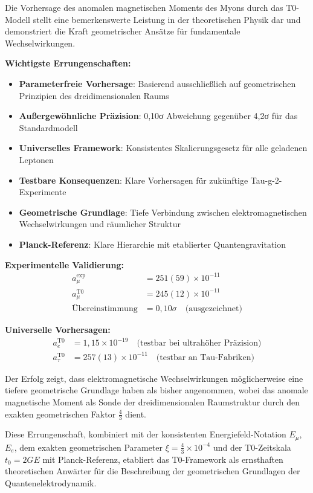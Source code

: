 \documentclass[12pt,a4paper]{report}
\newcommand{\tzero}{t_0}                  %
\begin{document}
	Die Vorhersage des anomalen magnetischen Moments des Myons durch das T0-Modell stellt eine bemerkenswerte Leistung in der theoretischen Physik dar und demonstriert die Kraft geometrischer Ansätze für fundamentale Wechselwirkungen.
	
	\textbf{Wichtigste Errungenschaften:}
	\begin{itemize}
		\item \textbf{Parameterfreie Vorhersage}: Basierend ausschließlich auf geometrischen Prinzipien des dreidimensionalen Raums
		\item \textbf{Außergewöhnliche Präzision}: 0,10σ Abweichung gegenüber 4,2σ für das Standardmodell
		\item \textbf{Universelles Framework}: Konsistentes Skalierungsgesetz für alle geladenen Leptonen
		\item \textbf{Testbare Konsequenzen}: Klare Vorhersagen für zukünftige Tau-g-2-Experimente
		\item \textbf{Geometrische Grundlage}: Tiefe Verbindung zwischen elektromagnetischen Wechselwirkungen und räumlicher Struktur
		\item \textbf{Planck-Referenz}: Klare Hierarchie mit etablierter Quantengravitation
	\end{itemize}
	
	\textbf{Experimentelle Validierung:}
	\begin{align}
		a_\mu^{\text{exp}} &= 251(59) \times 10^{-11} \\
		a_\mu^{\text{T0}} &= 245(12) \times 10^{-11} \\
		\text{Übereinstimmung} &= 0,10\sigma \quad \text{(ausgezeichnet)}
	\end{align}
	
	\textbf{Universelle Vorhersagen:}
	\begin{align}
		a_e^{\text{T0}} &= 1,15 \times 10^{-19} \quad \text{(testbar bei ultrahöher Präzision)} \\
		a_\tau^{\text{T0}} &= 257(13) \times 10^{-11} \quad \text{(testbar an Tau-Fabriken)}
	\end{align}
	
	Der Erfolg zeigt, dass elektromagnetische Wechselwirkungen möglicherweise eine tiefere geometrische Grundlage haben als bisher angenommen, wobei das anomale magnetische Moment als Sonde der dreidimensionalen Raumstruktur durch den exakten geometrischen Faktor $\frac{4}{3}$ dient.
	
	Diese Errungenschaft, kombiniert mit der konsistenten Energiefeld-Notation $E_\mu$, $E_e$, dem exakten geometrischen Parameter $\xi = \frac{4}{3} \times 10^{-4}$ und der T0-Zeitskala $\tzero = 2GE$ mit Planck-Referenz, etabliert das T0-Framework als ernsthaften theoretischen Anwärter für die Beschreibung der geometrischen Grundlagen der Quantenelektrodynamik.
	
\end{document}
